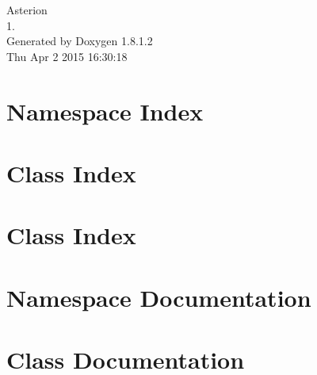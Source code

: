 \documentclass{book}
\begin{document}
\hypersetup{pageanchor=false,citecolor=blue}
\begin{titlepage}
\vspace*{7cm}
\begin{center}
{\Large Asterion \\[1ex]\large 1. }\\
\vspace*{1cm}
{\large Generated by Doxygen 1.8.1.2}\\
\vspace*{0.5cm}
{\small Thu Apr 2 2015 16:30:18}\\
\end{center}
\end{titlepage}
\clearemptydoublepage
{}
\tableofcontents
\clearemptydoublepage
{}
\hypersetup{pageanchor=true,citecolor=blue}
\chapter{Namespace Index}

\chapter{Class Index}

\chapter{Class Index}

\chapter{Namespace Documentation}




\chapter{Class Documentation}








\printindex
\end{document}
